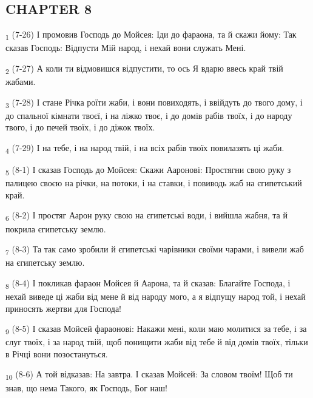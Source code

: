 \subsection{CHAPTER 8}
\begin{tcolorbox}
\textsubscript{1} (7-26) І промовив Господь до Мойсея: Іди до фараона, та й скажи йому: Так сказав Господь: Відпусти Мій народ, і нехай вони служать Мені.
\end{tcolorbox}
\begin{tcolorbox}
\textsubscript{2} (7-27) А коли ти відмовишся відпустити, то ось Я вдарю ввесь край твій жабами.
\end{tcolorbox}
\begin{tcolorbox}
\textsubscript{3} (7-28) І стане Річка роїти жаби, і вони повиходять, і ввійдуть до твого дому, і до спальної кімнати твоєї, і на ліжко твоє, і до домів рабів твоїх, і до народу твого, і до печей твоїх, і до діжок твоїх.
\end{tcolorbox}
\begin{tcolorbox}
\textsubscript{4} (7-29) І на тебе, і на народ твій, і на всіх рабів твоїх повилазять ці жаби.
\end{tcolorbox}
\begin{tcolorbox}
\textsubscript{5} (8-1) І сказав Господь до Мойсея: Скажи Ааронові: Простягни свою руку з палицею своєю на річки, на потоки, і на ставки, і повиводь жаб на єгипетський край.
\end{tcolorbox}
\begin{tcolorbox}
\textsubscript{6} (8-2) І простяг Аарон руку свою на єгипетські води, і вийшла жабня, та й покрила єгипетську землю.
\end{tcolorbox}
\begin{tcolorbox}
\textsubscript{7} (8-3) Та так само зробили й єгипетські чарівники своїми чарами, і вивели жаб на єгипетську землю.
\end{tcolorbox}
\begin{tcolorbox}
\textsubscript{8} (8-4) І покликав фараон Мойсея й Аарона, та й сказав: Благайте Господа, і нехай виведе ці жаби від мене й від народу мого, а я відпущу народ той, і нехай приносять жертви для Господа!
\end{tcolorbox}
\begin{tcolorbox}
\textsubscript{9} (8-5) І сказав Мойсей фараонові: Накажи мені, коли маю молитися за тебе, і за слуг твоїх, і за народ твій, щоб понищити жаби від тебе й від домів твоїх, тільки в Річці вони позостануться.
\end{tcolorbox}
\begin{tcolorbox}
\textsubscript{10} (8-6) А той відказав: На завтра. І сказав Мойсей: За словом твоїм! Щоб ти знав, що нема Такого, як Господь, Бог наш!
\end{tcolorbox}
